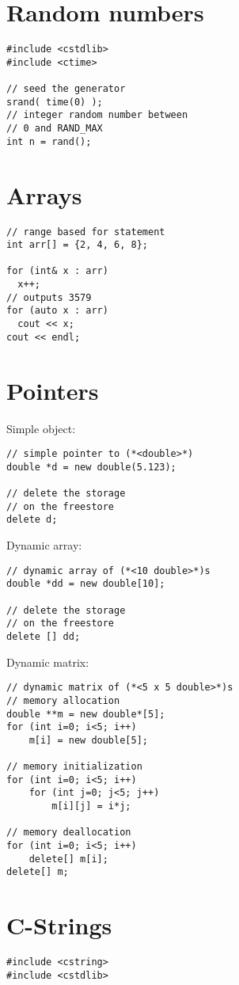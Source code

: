 \documentclass[10pt]{article}
\begin{document}
\begin{multicols*}{3}
\section*{Random numbers}
\small
\begin{lstlisting}
#include <cstdlib>
#include <ctime>

// seed the generator
srand( time(0) );
// integer random number between
// 0 and RAND_MAX
int n = rand();
\end{lstlisting}
%
%
\section*{Arrays}
\small
\begin{lstlisting}
// range based for statement
int arr[] = {2, 4, 6, 8};

for (int& x : arr)
  x++;
// outputs 3579
for (auto x : arr)
  cout << x;
cout << endl;
\end{lstlisting}
%
%
\section*{Pointers}
\small
Simple object:
\begin{lstlisting}
// simple pointer to (*<double>*)
double *d = new double(5.123);

// delete the storage
// on the freestore
delete d;
\end{lstlisting}
Dynamic array:
\begin{lstlisting}
// dynamic array of (*<10 double>*)s
double *dd = new double[10];

// delete the storage
// on the freestore
delete [] dd;
\end{lstlisting}
Dynamic matrix:
\begin{lstlisting}
// dynamic matrix of (*<5 x 5 double>*)s
// memory allocation
double **m = new double*[5];
for (int i=0; i<5; i++)
    m[i] = new double[5];

// memory initialization    
for (int i=0; i<5; i++)
    for (int j=0; j<5; j++)
        m[i][j] = i*j;

// memory deallocation
for (int i=0; i<5; i++)
    delete[] m[i];
delete[] m;
\end{lstlisting}
%
%
\section*{C-Strings}
\small
\begin{lstlisting}
#include <cstring>
#include <cstdlib>


\end{lstlisting}
\end{multicols*}
\end{document}
